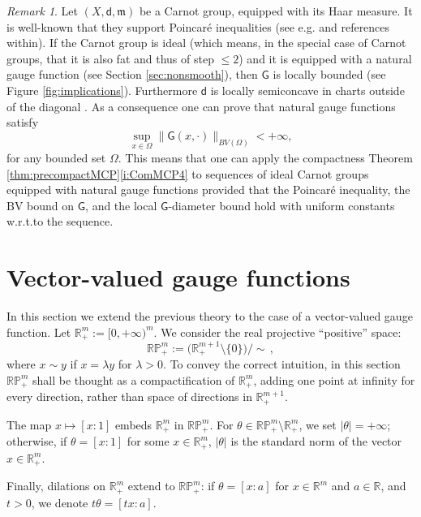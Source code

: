 \documentclass[11pt,a4paper]{article}
\theoremstyle{plain}
\theoremstyle{definition}
\theoremstyle{remark}
\newtheorem{remark}[theorem]{Remark}
\numberwithin{equation}{section}
\newcommand{\R}{\mathbb{R}} %
\newcommand{\RP}{\mathbb{RP}} %
\newcommand{\mm}{\mathfrak m}
\newcommand{\sfd}{\mathsf d}
\newcommand{\sfG}{\mathsf G}
\begin{document}
\begin{remark}
Let $(X,\sfd,\mm)$ be a Carnot group, equipped with its Haar measure. It is well-known that they support Poincaré inequalities (see e.g.\@ \cite[Prop.\@ 11.17]{SobmetPoincare} and references within). If the Carnot group is ideal (which means, in the special case of Carnot groups, that it is also fat and thus of step $\leq 2$) and it is equipped with a natural gauge function (see Section \ref{sec:nonsmooth}), then $\sfG$ is locally bounded (see Figure \ref{fig:implications}). Furthermore $\sfd$ is locally semiconcave in charts outside of the diagonal \cite{riffordbook}. As a consequence one can prove that natural gauge functions satisfy
\begin{equation}\label{eq:labelfake}
\sup_{x\in \Omega} \| \sfG(x,\cdot)\|_{BV(\Omega)} < +\infty,
\end{equation}
for any bounded set $\Omega$. This means that one can apply the compactness Theorem \ref{thm:precompactMCP}\ref{i:ComMCP4} to sequences of ideal Carnot groups equipped with natural gauge functions provided that the Poincaré inequality, the $\mathrm{BV}$ bound on $\sfG$, and the local $\sfG$-diameter bound hold with uniform constants w.r.t.\@ to the sequence.
\end{remark}

\section{Vector-valued gauge functions}\label{sec:vectorial}

In this section we extend the previous theory to the case of a vector-valued gauge function. Let $\R^m_{+}:=[0,+\infty)^m$. We consider the real projective ``positive'' space:
\begin{equation}
\RP^m_+ :=  \Big(\R^{m+1}_{+} \setminus \{0\}\Big)/ \sim\,,
\end{equation}
where $x\sim y$ if $x=\lambda y$ for $\lambda > 0$.  To convey the correct intuition, in this section $\RP^m_{+}$ shall be thought as a compactification of $\R^m_{+}$, adding one point at infinity for every direction, rather than space of directions in $\R^{m+1}_{+}$.

The map $x \mapsto [x:1]$ embeds $\R^m_+$ in $\RP^m_+$.  For $\theta\in  \RP_+^m\setminus  \R^m_+$, we set $|\theta|=+\infty$; otherwise, if $\theta = [x:1]$ for some $x\in \R^m_+$, $|\theta|$ is the standard norm of the vector $x \in  \R^m_+$.

Finally, dilations on $\R^m_+$ extend to $\RP^m_+$: if $\theta = [x:a]$ for $x\in \R^m$ and $a\in \R$, and $t>0$, we denote $t\theta = [t x: a]$. 
\end{document}
